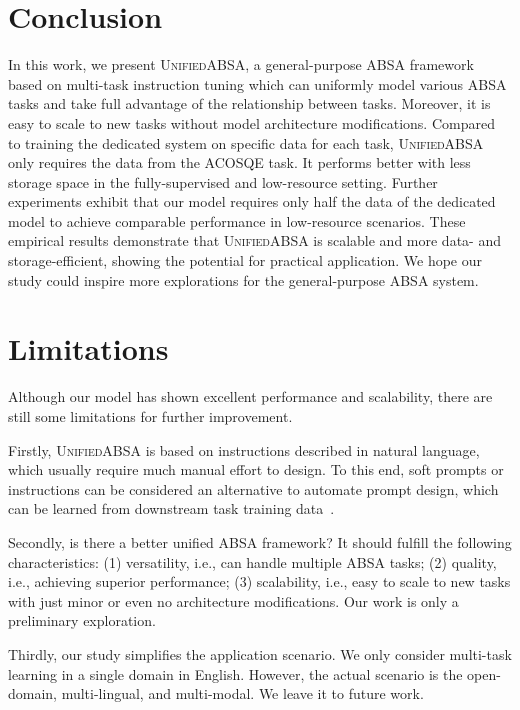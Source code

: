 \documentclass[11pt]{article}
\newcommand{\UnifiedABSA}{\textsc{UnifiedABSA}\xspace}
\begin{document}
\section{Conclusion}

In this work, we present \UnifiedABSA, a general-purpose ABSA framework based on multi-task instruction tuning which can uniformly model various ABSA tasks and take full advantage of the relationship between tasks. Moreover, it is easy to scale to new tasks without model architecture modifications. Compared to training the dedicated system on specific data for each task, \UnifiedABSA only requires the data from the ACOSQE task. It performs better with less storage space in the fully-supervised and low-resource setting. Further experiments exhibit that our model requires only half the data of the dedicated model to achieve comparable performance in low-resource scenarios. These empirical results demonstrate that \UnifiedABSA is scalable and more data- and storage-efficient, showing the potential for practical application. We hope our study could inspire more explorations for the general-purpose ABSA system.







\section*{Limitations}

Although our model has shown excellent performance and scalability, there are still some limitations for further improvement. 

Firstly, \UnifiedABSA is based on instructions described in natural language, which usually require much manual effort to design. To this end, soft prompts or instructions can be considered an alternative to automate prompt design, which can be learned from downstream task training data~\citep{gao-etal-2021lm-bff,lester-etal-2021-prompt-tuning}.

Secondly, is there a better unified ABSA framework? It should fulfill the following characteristics: 
(1) versatility, i.e., can handle multiple ABSA tasks; 
(2) quality, i.e., achieving superior performance; 
(3) scalability, i.e., easy to scale to new tasks with just minor or even no architecture modifications. Our work is only a preliminary exploration.

Thirdly, our study simplifies the application scenario. We only consider multi-task learning in a single domain in English. However, the actual scenario is the open-domain, multi-lingual, and multi-modal. We leave it to future work. 
\end{document}
